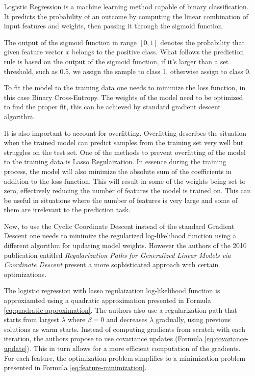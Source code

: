 \documentclass[11pt]{article}
\begin{document}

Logistic Regression is a machine learning method capable of binary classification. It predicts the probability of an outcome by computing the linear combination of input features and weights, then passing it through the sigmoid function.

The output of the sigmoid function in range $[0,1]$ denotes the probability that given feature vector $x$ belongs to the positive class. What follows the prediction rule is based on the output of the sigmoid function, if it's larger than a set threshold, such as 0.5, we assign the sample to class 1, otherwise assign to class 0.

To fit the model to the training data one needs to minimize the loss function, in this case Binary Cross-Entropy. The weights of the model need to be optimized to find the proper fit, this can be achieved by standard gradient descent algorithm.

It is also important to account for overfitting. Overfitting describes the situation when the trained model can predict samples from the training set very well but struggles on the test set. One of the methods to prevent overfitting of the model to the training data is Lasso Regulaization. In essence during the training process, the model will also minimize the absolute sum of the coefficients in addition to the loss function. This will result in some of the weights being set to zero, effectively reducing the number of features the model is trained on. This can be useful in situations where the number of features is very large and some of them are irrelevant to the prediction task.

Now, to use the Cyclic Coordinate Descent instead of the standard Gradient Descent one needs to minimize the regularized log-likelihood function using a different algorithm for updating model weights. However the authors of the 2010 publication entitled \textit{Regularization Paths for Generalized Linear Models via Coordinate Descent} \cite{Friedman2010} present a more sophisticated approach with certain optimizations.


The logistic regression with lasso regulaization log-likelihood function is approxiamted using a quadratic approximation presented in Formula \ref{eq:quadratic-approximation}. The authors also use a regularization path that starts from largest $\lambda$ where $\beta = 0$ and decreases $\lambda$ gradually, using previous solutions as warm starts. Instead of computing gradients from scratch with each iteration, the authors propose to use covariance updates (Formula \ref{eq:covariance-update}). This in turn allows for a more efficient computation of the gradients. For each feature, the optimization problem simplifies to a minimization problem presented in Formula \ref{eq:feature-minimization}.
\end{document}

